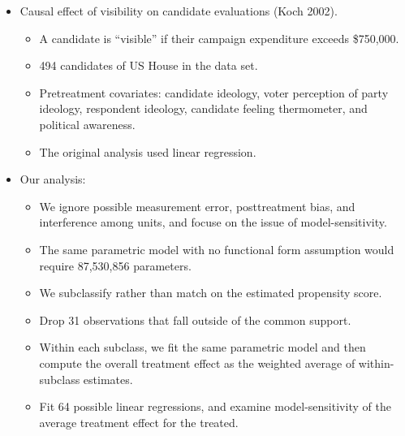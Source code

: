 \documentclass[20pt,landscape,pdftex]{foils}
\begin{document}


\hypersetup{pdfpagetransition=Replace}

\begin{itemize}
\item Causal effect of visibility on candidate evaluations (Koch
  2002).\pause
  \begin{itemize}
  \item A candidate is ``visible'' if their campaign expenditure exceeds
    \$750,000.\pause
  \item 494 candidates of US House in the data set.\pause
  \item Pretreatment covariates: candidate ideology, voter perception
    of party ideology, respondent ideology, candidate feeling
    thermometer, and political awareness.\pause
  \item The original analysis used linear regression.\pause
  \end{itemize}

\item Our analysis:
  \begin{itemize}
  \item We ignore possible measurement error, posttreatment bias, and
    interference among units, and focuse on the issue of
    model-sensitivity.\pause
    
  \item The same parametric model with no functional form assumption
    would require 87,530,856 parameters.\pause  
    
  \item We subclassify rather than match on the estimated propensity
    score.\pause
    
  \item Drop 31 observations that fall outside of the common
    support.\pause
  \item Within each subclass, we fit the same parametric model and
    then compute the overall treatment effect as the weighted average
    of within-subclass estimates.\pause
    
  \item Fit 64 possible linear regressions, and examine
    model-sensitivity of the average treatment effect for the treated.\pause
  \end{itemize}
\end{itemize}
\end{document}
